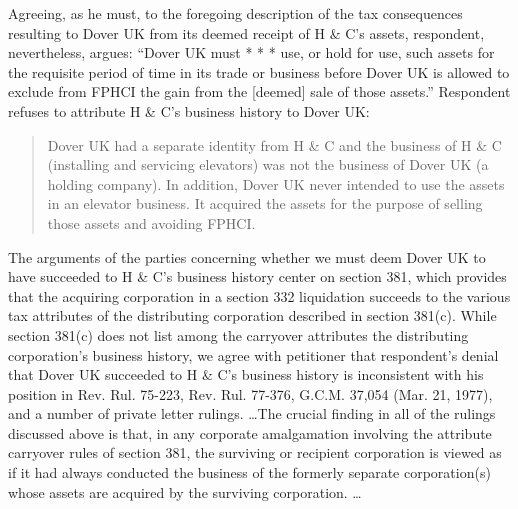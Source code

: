 \begin{select}
Agreeing, as he must, to the foregoing description of the tax consequences resulting to Dover UK from its deemed receipt of H \& C's assets, respondent, nevertheless, argues: ``Dover UK must * * * use, or hold for use, such assets for the requisite period of time in its trade or business before Dover UK is allowed to exclude from FPHCI the gain from the [deemed] sale of those assets.'' Respondent refuses to attribute H \& C's business history to Dover UK:
\begin{quote}Dover UK had a separate identity from H \& C and the business of H \& C (installing and servicing elevators) was not the
business of Dover UK (a holding company). In addition, Dover UK never intended to use the assets in an elevator business.
It acquired the assets for the purpose of selling those assets and avoiding FPHCI.
\end{quote}
The arguments of the parties concerning whether we must deem Dover UK to have succeeded to H \& C's business history center on section 381, which provides that the acquiring corporation in a section 332 liquidation succeeds to the various tax attributes of the distributing corporation described in section 381(c). While section 381(c) does not list among the carryover attributes the distributing corporation's business history, we agree with petitioner that respondent's denial that Dover UK succeeded to H \& C's business history is inconsistent with his position in Rev. Rul. 75-223, Rev. Rul. 77-376, G.C.M. 37,054 (Mar. 21, 1977), and a number of private letter rulings. \ldots The crucial finding in all of the rulings discussed above is that, in any corporate amalgamation involving the attribute carryover rules of section 381, the surviving or recipient corporation is viewed as if it had always conducted the business of the formerly separate corporation(s) whose assets are acquired by the surviving corporation. \ldots 


\end{select}
